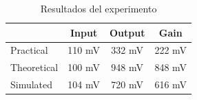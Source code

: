 \begin{table}[H]
\centering
\caption{Resultados del experimento}
\label{tab:resultados2}
\begin{tabular}{lccc} %
\toprule
 & Input & Output & Gain \\ 
\midrule
Practical   & 110 mV & 332 mV & 222 mV\\ 
Theoretical & 100 mV & 948 mV & 848 mV\\ 
Simulated   & 104 mV & 720 mV & 616 mV \\ 
\bottomrule
\end{tabular}
\end{table}




